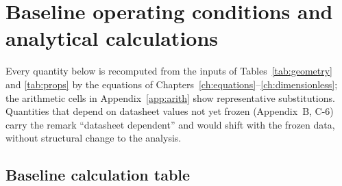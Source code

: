 \chapter{Baseline operating conditions and analytical calculations}
\label{ch:baseline}

Every quantity below is recomputed from the inputs of Tables~\ref{tab:geometry} and
\ref{tab:props} by the equations of Chapters~\ref{ch:equations}--\ref{ch:dimensionless}; the
arithmetic cells in Appendix~\ref{app:arith} show representative substitutions. Quantities that
depend on datasheet values not yet frozen (Appendix~B, C-6) carry the remark ``datasheet
dependent'' and would shift with the frozen data, without structural change to the analysis.

\section{Baseline calculation table}
\label{sec:baselinecalc}
